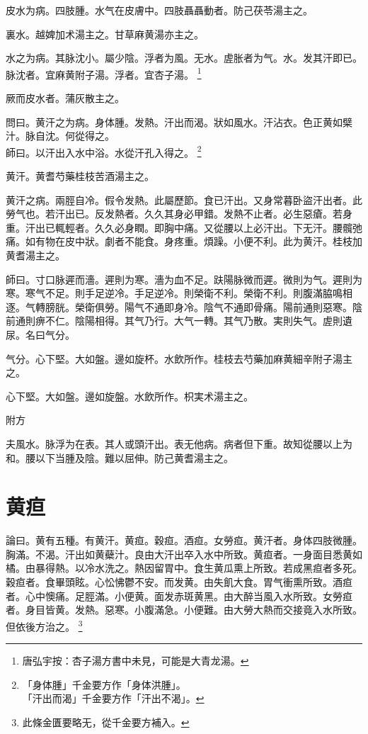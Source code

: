 皮水为病。四肢腫。水气在皮膚中。四肢聶聶動者。防己茯苓湯主之。

裏水。越婢加术湯主之。甘草麻黄湯亦主之。

水之为病。其脉沈小。屬少陰。浮者为風。无水。虗胀者为气。水。发其汗即已。脉沈者。宜麻黄附子湯。浮者。宜杏子湯。
	\footnote{唐弘宇按：杏子湯方書中未見，可能是大青龙湯。}

厥而皮水者。蒲灰散主之。

問曰。黄汗之为病。身体腫。发熱。汗出而渴。狀如風水。汗沾衣。色正黄如檗汁。脉自沈。何從得之。\\
師曰。以汗出入水中浴。水從汗孔入得之。
	\footnote{「身体腫」千金要方作「身体洪腫」。\\「汗出而渴」千金要方作「汗出不渴」。}

黄汗。黄耆芍藥桂枝苦酒湯主之。

黄汗之病。兩脛自冷。假令发熱。此屬歷節。食已汗出。又身常暮{\khaaitp 卧}盜汗出者。此勞气也。若汗出已。反发熱者。久久其身必甲錯。发熱不止者。必生惡瘡。若身重。汗出已輒輕者。久久必身瞤。即胸中痛。又從腰以上必汗出。下无汗。腰髖弛痛。如有物在皮中狀。劇者不能食。身疼重。煩躁。小便不利。此为黄汗。桂枝加黄耆湯主之。

師曰。寸口脉遲而濇。遲則为寒。濇为血不足。趺陽脉微而遲。微則为气。遲則为寒。寒气不足。則手足逆冷。手足逆冷。則榮衛不利。榮衛不利。則腹滿脇鳴相逐。气轉膀胱。榮衛俱勞。陽气不通即身冷。陰气不通即骨痛。陽前通則惡寒。陰前通則痹不仁。陰陽相得。其气乃行。大气一轉。其气乃散。実則失气。虗則遺尿。名曰气分。

气分。心下堅。大如盤。邊如旋杯。水飲所作。桂枝去芍藥加麻{\khaaitp 黄細}辛附子湯主之。

心下堅。大如盤。邊如旋盤。水飲所作。枳{\khaaitp 実}术湯主之。

附方

夫風水。脉浮为在表。其人或頭汗出。表无他病。病者但下重。故知從腰以上为和。腰以下当腫及陰。難以屈伸。防己黄耆湯主之。

\chapter{黄疸}

論曰。黄有五種。有黄汗。黄疸。穀疸。酒疸。女勞疸。黄汗者。身体四肢微腫。胸滿。不渴。汗出如黄蘗汁。良由大汗出卒入水中所致。黄疸者。一身面目悉黄如橘。由暴得熱。以冷水洗之。熱因留胃中。食生黄瓜熏上所致。若成黑疸者多死。穀疸者。食畢頭眩。心忪怫鬱不安。而发黄。由失飢大食。胃气衝熏所致。酒疸者。心中懊痛。足脛滿。小便黄。面发赤斑黄黑。由大醉当風入水所致。女勞疸者。身目皆黄。发熱。惡寒。小腹滿急。小便難。由大勞大熱而交接竟入水所致。但依後方治之。{\qianjin}
	\footnote{此條金匱要略无，從千金要方補入。}

